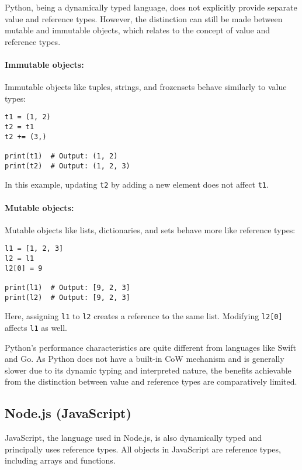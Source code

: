 Python, being a dynamically typed language, does not explicitly provide separate value and reference types. However, the distinction can still be made between mutable and immutable objects, which relates to the concept of value and reference types.

\paragraph{Immutable objects:}
Immutable objects like tuples, strings, and frozensets behave similarly to value types:

\begin{verbatim}
t1 = (1, 2)
t2 = t1
t2 += (3,)

print(t1)  # Output: (1, 2)
print(t2)  # Output: (1, 2, 3)
\end{verbatim}

In this example, updating \texttt{t2} by adding a new element does not affect \texttt{t1}.

\paragraph{Mutable objects:}
Mutable objects like lists, dictionaries, and sets behave more like reference types:

\begin{verbatim}
l1 = [1, 2, 3]
l2 = l1
l2[0] = 9

print(l1)  # Output: [9, 2, 3]
print(l2)  # Output: [9, 2, 3]
\end{verbatim}

Here, assigning \texttt{l1} to \texttt{l2} creates a reference to the same list. Modifying \texttt{l2[0]} affects \texttt{l1} as well.

Python's performance characteristics are quite different from languages like Swift and Go. As Python does not have a built-in CoW mechanism and is generally slower due to its dynamic typing and interpreted nature, the benefits achievable from the distinction between value and reference types are comparatively limited.

\subsection{Node.js (JavaScript)}

JavaScript, the language used in Node.js, is also dynamically typed and principally uses reference types. All objects in JavaScript are reference types, including arrays and functions.

